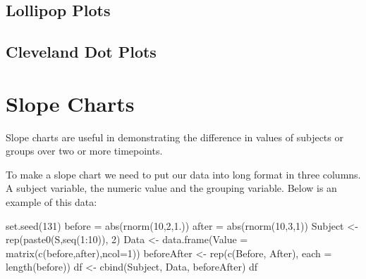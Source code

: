 \documentclass[
  letterpaper,
  DIV=11,
  numbers=noendperiod]{scrreprt}
\newenvironment{Shaded}{\begin{snugshade}}{\end{snugshade}}
\newcommand{\AttributeTok}[1]{\textcolor[rgb]{0.40,0.45,0.13}{#1}}
\newcommand{\DecValTok}[1]{\textcolor[rgb]{0.68,0.00,0.00}{#1}}
\newcommand{\FloatTok}[1]{\textcolor[rgb]{0.68,0.00,0.00}{#1}}
\newcommand{\FunctionTok}[1]{\textcolor[rgb]{0.28,0.35,0.67}{#1}}
\newcommand{\NormalTok}[1]{\textcolor[rgb]{0.00,0.23,0.31}{#1}}
\newcommand{\OtherTok}[1]{\textcolor[rgb]{0.00,0.23,0.31}{#1}}
\newcommand{\SpecialCharTok}[1]{\textcolor[rgb]{0.37,0.37,0.37}{#1}}
\newcommand{\StringTok}[1]{\textcolor[rgb]{0.13,0.47,0.30}{#1}}
\begin{document}
\hypertarget{lollipop-plots}{%
\section{Lollipop Plots}\label{lollipop-plots}}

\hypertarget{cleveland-dot-plots}{%
\section{Cleveland Dot Plots}\label{cleveland-dot-plots}}


\hypertarget{slope-charts}{%
\chapter{Slope Charts}\label{slope-charts}}

Slope charts are useful in demonstrating the difference in values of
subjects or groups over two or more timepoints.

To make a slope chart we need to put our data into long format in three
columns. A subject variable, the numeric value and the grouping
variable. Below is an example of this data:

\begin{Shaded}
\begin{Highlighting}[]
\FunctionTok{set.seed}\NormalTok{(}\DecValTok{131}\NormalTok{) }
\NormalTok{before }\OtherTok{=} \FunctionTok{abs}\NormalTok{(}\FunctionTok{rnorm}\NormalTok{(}\DecValTok{10}\NormalTok{,}\DecValTok{2}\NormalTok{,}\FloatTok{1.}\NormalTok{))}
\NormalTok{after }\OtherTok{=} \FunctionTok{abs}\NormalTok{(}\FunctionTok{rnorm}\NormalTok{(}\DecValTok{10}\NormalTok{,}\DecValTok{3}\NormalTok{,}\DecValTok{1}\NormalTok{))}
\NormalTok{Subject }\OtherTok{\textless{}{-}} \FunctionTok{rep}\NormalTok{(}\FunctionTok{paste0}\NormalTok{(}\StringTok{\textquotesingle{}S\textquotesingle{}}\NormalTok{,}\FunctionTok{seq}\NormalTok{(}\DecValTok{1}\SpecialCharTok{:}\DecValTok{10}\NormalTok{)), }\DecValTok{2}\NormalTok{)}
\NormalTok{Data }\OtherTok{\textless{}{-}} \FunctionTok{data.frame}\NormalTok{(}\AttributeTok{Value =} \FunctionTok{matrix}\NormalTok{(}\FunctionTok{c}\NormalTok{(before,after),}\AttributeTok{ncol=}\DecValTok{1}\NormalTok{))}
\NormalTok{beforeAfter }\OtherTok{\textless{}{-}} \FunctionTok{rep}\NormalTok{(}\FunctionTok{c}\NormalTok{(}\StringTok{\textquotesingle{}Before\textquotesingle{}}\NormalTok{, }\StringTok{\textquotesingle{}After\textquotesingle{}}\NormalTok{), }\AttributeTok{each =} \FunctionTok{length}\NormalTok{(before))}
\NormalTok{df }\OtherTok{\textless{}{-}} \FunctionTok{cbind}\NormalTok{(Subject, Data, beforeAfter)}
\NormalTok{df}
\end{Highlighting}
\end{Shaded}
\end{document}
